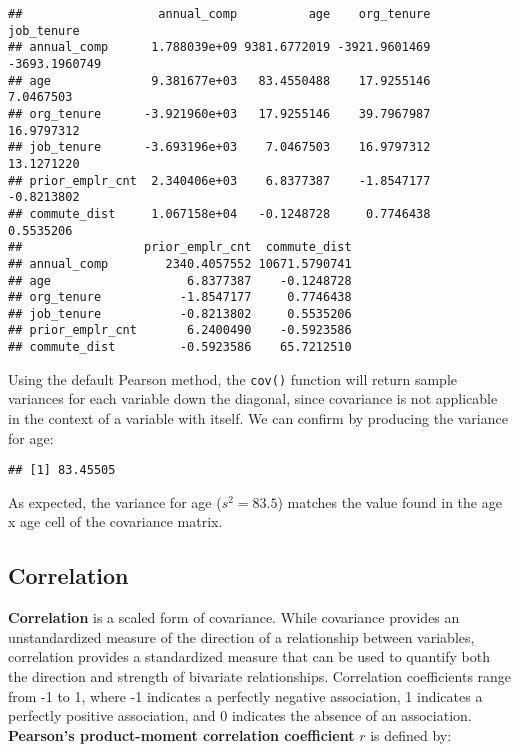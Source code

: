 \documentclass[
]{book}
\newenvironment{Shaded}{\begin{snugshade}}{\end{snugshade}}
\newcommand{\CommentTok}[1]{\textcolor[rgb]{0.56,0.35,0.01}{\textit{#1}}}
\newcommand{\FunctionTok}[1]{\textcolor[rgb]{0.00,0.00,0.00}{#1}}
\newcommand{\NormalTok}[1]{#1}
\newcommand{\SpecialCharTok}[1]{\textcolor[rgb]{0.00,0.00,0.00}{#1}}
\begin{document}
\begin{verbatim}
##                   annual_comp          age    org_tenure    job_tenure
## annual_comp      1.788039e+09 9381.6772019 -3921.9601469 -3693.1960749
## age              9.381677e+03   83.4550488    17.9255146     7.0467503
## org_tenure      -3.921960e+03   17.9255146    39.7967987    16.9797312
## job_tenure      -3.693196e+03    7.0467503    16.9797312    13.1271220
## prior_emplr_cnt  2.340406e+03    6.8377387    -1.8547177    -0.8213802
## commute_dist     1.067158e+04   -0.1248728     0.7746438     0.5535206
##                 prior_emplr_cnt  commute_dist
## annual_comp        2340.4057552 10671.5790741
## age                   6.8377387    -0.1248728
## org_tenure           -1.8547177     0.7746438
## job_tenure           -0.8213802     0.5535206
## prior_emplr_cnt       6.2400490    -0.5923586
## commute_dist         -0.5923586    65.7212510
\end{verbatim}

Using the default Pearson method, the \texttt{cov()} function will return sample variances for each variable down the diagonal, since covariance is not applicable in the context of a variable with itself. We can confirm by producing the variance for age:

\begin{Shaded}
\end{Shaded}

\begin{verbatim}
## [1] 83.45505
\end{verbatim}

As expected, the variance for age (\(s^{2} = 83.5\)) matches the value found in the age x age cell of the covariance matrix.

\hypertarget{correlation}{%
\subsection{Correlation}\label{correlation}}

\textbf{Correlation} is a scaled form of covariance. While covariance provides an unstandardized measure of the direction of a relationship between variables, correlation provides a standardized measure that can be used to quantify both the direction and strength of bivariate relationships. Correlation coefficients range from -1 to 1, where -1 indicates a perfectly negative association, 1 indicates a perfectly positive association, and 0 indicates the absence of an association. \textbf{Pearson's product-moment correlation coefficient} \(r\) is defined by:
\end{document}
